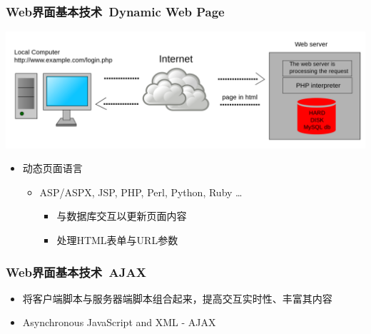\documentclass{beamer}
\begin{document}
\begin{frame}
	\frametitle{Web界面基本技术~{\small Dynamic Web Page}}
	\begin{center}
	\includegraphics[width=.8\textwidth]{images/2000px-Scheme_dynamic_page_en.svg.png}
	\end{center}
	\beamertemplatetransparentcovereddynamicmedium
	\begin{itemize}[<+->]
		\item 动态页面语言
		\begin{itemize}
			\item ASP/ASPX, JSP, PHP, Perl, Python, Ruby \dots
			\begin{itemize}
				\item 与数据库交互以更新页面内容
				\item 处理HTML表单与URL参数
			\end{itemize}
		\end{itemize}
	\end{itemize}
\end{frame}

\begin{frame}
	\frametitle{Web界面基本技术~{\small AJAX}}
	\beamertemplatetransparentcovereddynamicmedium
	\begin{itemize}[<+->]
		\item 将客户端脚本与服务器端脚本组合起来，提高交互实时性、丰富其内容
		\item Asynchronous JavaScript and XML - AJAX
	\end{itemize}
\end{frame}
\end{document}
